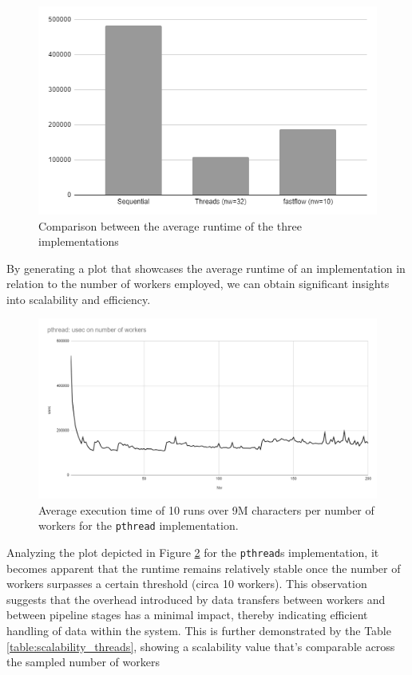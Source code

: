 \documentclass[10pt]{article}
\begin{document}
\begin{figure}[H]
\begin{center}
	\includegraphics[scale=0.75]{runtimes.png}
\end{center}
\caption{Comparison between the average runtime of the three implementations}
\label{figure:runtimes}
\end{figure}
By generating a plot that showcases the average runtime of an implementation in relation to the number of workers employed, we can obtain significant insights into scalability and efficiency. 
\begin{figure}[H]
\begin{center}
	\includegraphics[scale=.6]{scalability_pthreads.png}
\end{center}
\caption{Average execution time of 10 runs over 9M characters per number of workers for the \texttt{pthread} implementation.}
\label{figure:scalability_threads}
\end{figure}
Analyzing the plot depicted in Figure \ref{figure:scalability_threads} for the \texttt{pthread}s implementation, it becomes apparent that the runtime remains relatively stable once the number of workers surpasses a certain threshold (circa 10 workers). This observation suggests that the overhead introduced by data transfers between workers and between pipeline stages has a minimal impact, thereby indicating efficient handling of data within the system. This is further demonstrated by the Table \ref{table:scalability_threads}, showing a scalability value that's comparable across the sampled number of workers\\
\end{document}
